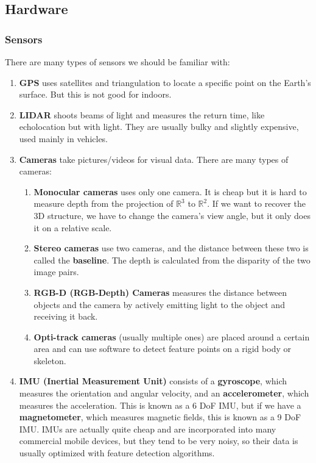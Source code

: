 \documentclass{article}
\newcounter{algo}[section]
\begin{document}
  \subsection{Hardware}

  \subsubsection{Sensors}

  There are many types of sensors we should be familiar with: 
  \begin{enumerate}
      \item \textbf{GPS} uses satellites and triangulation to locate a specific point on the Earth's surface. But this is not good for indoors. 
      \item \textbf{LIDAR} shoots beams of light and measures the return time, like echolocation but with light. They are usually bulky and slightly expensive, used mainly in vehicles. 
      \item \textbf{Cameras} take pictures/videos for visual data. There are many types of cameras: 
      \begin{enumerate}
          \item \textbf{Monocular cameras} uses only one camera. It is cheap but it is hard to measure depth from the projection of $\mathbb{R}^3$ to $\mathbb{R}^2$. If we want to recover the 3D structure, we have to change the camera's view angle, but it only does it on a relative scale. 
          \item \textbf{Stereo cameras} use two cameras, and the distance between these two is called the \textbf{baseline}. The depth is calculated from the disparity of the two image pairs. 
          \item \textbf{RGB-D (RGB-Depth) Cameras} measures the distance between objects and the camera by actively emitting light to the object and receiving it back. 
          \item \textbf{Opti-track cameras} (usually multiple ones) are placed around a certain area and can use software to detect feature points on a rigid body or skeleton. 
  \end{enumerate}
      \item \textbf{IMU (Inertial Measurement Unit)} consists of a \textbf{gyroscope}, which measures the orientation and angular velocity, and an \textbf{accelerometer}, which measures the acceleration. This is known as a 6 DoF IMU, but if we have a \textbf{magnetometer}, which measures magnetic fields, this is known as a 9 DoF IMU. IMUs are actually quite cheap and are incorporated into many commercial mobile devices, but they tend to be very noisy, so their data is usually optimized with feature detection algorithms. 
  \end{enumerate}
\end{document}
